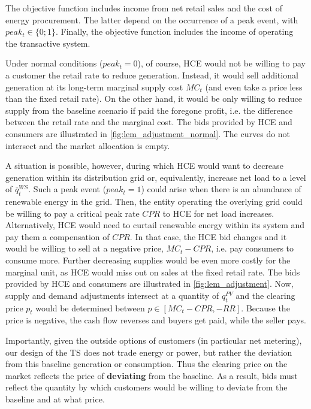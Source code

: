 \documentclass[12pt]{article}{Definitions/mdpi}
\begin{document}
The objective function includes income from net retail sales and the cost of energy procurement. The latter depend on the occurrence of a peak event, with $peak_t \in \{0;1\}$. Finally, the objective function includes the income of operating the transactive system. 

Under normal conditions ($peak_t = 0$), of course, HCE would not be willing to pay a customer the retail rate to reduce generation. Instead, it would sell additional generation at its long-term marginal supply cost $MC_t$ (and even take a price less than the fixed retail rate). On the other hand, it would be only willing to reduce supply from the baseline scenario if paid the foregone profit, i.e. the difference between the retail rate and the marginal cost. The bids provided by HCE and consumers are illustrated in \cref{fig:lem_adjustment_normal}. The curves do not intersect and the market allocation is empty.

A situation is possible, however, during which HCE would want to decrease generation within its distribution grid or, equivalently, increase net load to a level of $\overline{q}^{WS}_t$. Such a peak event ($peak_t = 1$) could arise when there is an abundance of renewable energy in the grid. Then, the entity operating the overlying grid could be willing to pay a critical peak rate $CPR$ to HCE for net load increases. Alternatively, HCE would need to curtail renewable energy within its system and pay them a compensation of $CPR$. In that case, the HCE bid changes and it would be willing to sell at a negative price, $MC_t - CPR$, i.e. pay consumers to consume more. Further decreasing supplies would be even more costly for the marginal unit, as HCE would miss out on sales at the fixed retail rate. 
The bids provided by HCE and consumers are illustrated in \cref{fig:lem_adjustment}. Now, supply and demand adjustments intersect at a quantity of $q^{PV}_t$ and the clearing price $p_t$ would be determined between $p \in [MC_t - CPR, -RR]$. Because the price is negative, the cash flow reverses and buyers get paid, while the seller pays.

Importantly, given the outside options of customers (in particular net metering), our design of the TS does not trade energy or power, but rather the deviation from this baseline generation or consumption. Thus the clearing price on the market reflects the price of \textbf{deviating} from the baseline. As a result, bids must reflect the quantity by which customers would be willing to deviate from the baseline and at what price. 
\end{document}
